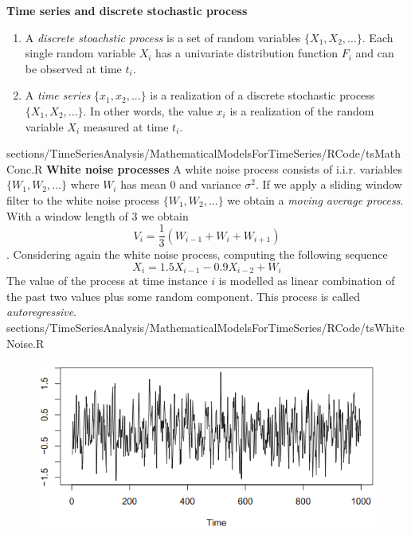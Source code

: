 {	\RTheory
	{\textbf{Time series and discrete stochastic process}
		\begin{enumerate}
			\item A \textit{discrete stoachstic process} is a set of random variables $\{X_1, X_2, . . . \}$. Each single random variable $X_i$ has a univariate distribution function $F_i$ and can be observed at time $t_i$.
			\item A \textit{time series} $\{x_1, x_2, . . .\}$ is a realization of a discrete stochastic process $\{X_1, X_2, . . . \}$. In other words, the value $x_i$ is a realization of the random variable $X_i$ measured at time $t_i$.
		\end{enumerate}
	}
	{sections/TimeSeriesAnalysis/MathematicalModelsForTimeSeries/RCode/tsMathConc.R}
\RTheory
{\textbf{White noise processes}\vfill
A white noise process consists of i.i.r. variables $\{W_1,W_2,...\}$ where $W_i$ has mean $0$ and variance $\sigma^2$.
\vfill
\hfill
\break
If we apply a sliding window filter to the white noise process $\{W_1, W_2,...\}$ we obtain a \textit{moving average process}. With a window length of 3 we obtain
$$V_i =\frac{1}{3}(W_{i-1}+W_{i}+W_{i+1})$$.
\vfill
\hfill
\break
Considering again the white noise process, computing the following sequence
$$X_i = 1.5X_{i-1}-0.9X_{i-2}+W_i $$
The value of the process at time instance $i$ is modelled as linear combination of the past two values plus some random component. This process is called \textit{autoregressive}.
}
{sections/TimeSeriesAnalysis/MathematicalModelsForTimeSeries/RCode/tsWhiteNoise.R}
\begin{figure}[H]\centering
	\begin{minipage}[c]{0.5\textwidth}
		\includegraphics[width=1\linewidth]{images/whNoMovAv.png}
		\label{Fig:whNoMA}
	\end{minipage}\hfill
	\begin{minipage}[c]{0.5\textwidth}

\end{minipage}
\end{figure}}
